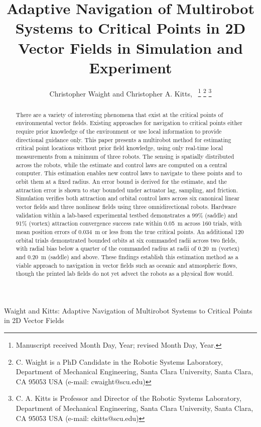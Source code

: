 \documentclass[lettersize,journal]{IEEEtran}
\newcommand{\rev}[1]{#1}
\begin{document}
\title{Adaptive Navigation of Multirobot Systems to Critical Points in 2D Vector Fields in Simulation and Experiment}
\author{Christopher Waight and Christopher A. Kitts,~
\thanks{Manuscript received Month Day, Year; revised Month Day, Year.}
\thanks{C. Waight is a PhD Candidate in the Robotic Systems Laboratory, Department of Mechanical Engineering, Santa Clara University, Santa Clara, CA 95053 USA (e-mail: cwaight@scu.edu)}
\thanks{C. A. Kitts is Professor and Director of the Robotic Systems Laboratory, Department of Mechanical Engineering, Santa Clara University, Santa Clara, CA 95053 USA (e-mail: ckitts@scu.edu)}
}
%
{Waight and Kitts: Adaptive Navigation of Multirobot Systems to Critical Points in 2D Vector Fields}


\maketitle

\begin{abstract}
    There are a variety of interesting phenomena that exist at the critical points of environmental vector fields. Existing approaches for navigation to critical points either require prior knowledge of the environment or use local information to provide directional guidance only. This paper presents a multirobot method for estimating critical point locations without prior field knowledge, using only real-time local measurements from a minimum of three robots. The sensing is spatially distributed across the robots, while the estimate and control laws are computed on a central computer.
    This estimation enables new control laws to navigate to these points and to orbit them at a fixed radius.
    An error bound is derived for the estimate, and the attraction error is shown to stay bounded under actuator lag, sampling, and friction.
    Simulation verifies both attraction and orbital control laws across six canonical linear vector fields and three nonlinear fields using three omnidirectional robots. Hardware validation within a lab-based experimental testbed demonstrates a \rev{99}\% (saddle) and \rev{91}\% (vortex) attraction convergence success rate within 0.05~m across \rev{160} trials, with mean position errors of \rev{0.034}~m or less from the true critical points. An additional \rev{120} orbital trials demonstrated bounded orbits at \rev{six} commanded radii across two fields, with radial bias below a quarter of the commanded radius at radii of \rev{0.20}~m (vortex) and \rev{0.20}~m (saddle) and above.
    These findings establish this estimation method as a viable approach to navigation in vector fields such as oceanic and atmospheric flows, though the printed lab fields do not yet advect the robots as a physical flow would.

\end{abstract}
\end{document}
